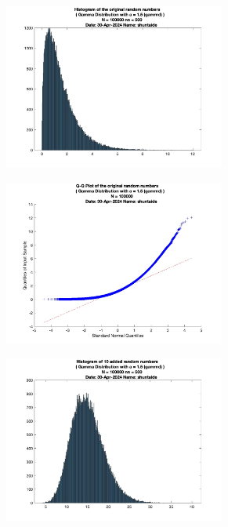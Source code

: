 \begin{figure}
	\centering
	\begin{subfigure}{0.48\linewidth}
		\centering
		\includegraphics[width=0.8\textwidth]{src/figures/cl-gamma/cl_original_gamrnd_hist_N=100000_nn=500.jpg}
		\label{fig:cl-gamma-original}
	\end{subfigure}
	\begin{subfigure}{0.48\linewidth}
		\centering
		\includegraphics[width=0.8\textwidth]{src/figures/cl-gamma/cl_original_gamrnd_qqpl_N=100000.jpg}
		\label{fig:cl-gamma-original-qqpl}
	\end{subfigure}
	\begin{subfigure}{0.48\linewidth}
		\centering
		\includegraphics[width=0.8\textwidth]{src/figures/cl-gamma/cl_added_gamrnd_hist_N=100000_nn=500.jpg}

\end{subfigure}
\end{figure}
